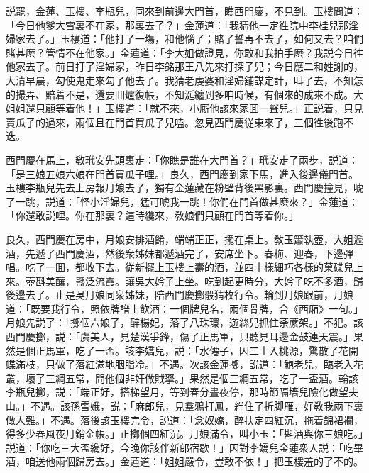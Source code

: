 説罷，金蓮、玉樓、李瓶兒，同來到前邊大門首，瞧西門慶，不見到。玉樓問道：「今日他爹大雪裏不在家，那裏去了？」金蓮道：「我猜他一定徃院中李桂兒那淫婦家去了。」玉樓道：「他打了一塲，和他惱了；賭了誓再不去了，如何又去？咱們賭甚麽？管情不在他家。」金蓮道：「李大姐做證見，你敢和我拍手麽？我説今日徃他家去了。前日打了淫婦家，昨日李銘那王八先來打探子兒；今日應二和姓謝的，大清早晨，勾使鬼走來勾了他去了。我猜老虔婆和淫婦舖謀定計，叫了去，不知怎的撮弄、賠着不是，還要囬爐復帳，不知涎纏到多咱時候，有個來的成來不成。大姐姐還只顧等着他！」玉樓道：「就不來，小廝他該來家囬一聲兒。」正説着，只見賣瓜子的過來，兩個且在門首買瓜子兒嗑。忽見西門慶従東來了，三個徃後跑不迭。

西門慶在馬上，敎玳安先頭裏走：「你瞧是誰在大門首？」玳安走了兩步，説道：「是三娘五娘六娘在門首買瓜子哩。」良久，西門慶到家下馬，進入後邊儀門首。玉樓李瓶兒先去上房報月娘去了，獨有金蓮藏在粉壁背後黑影裏。西門慶撞見，唬了一跳，説道：「怪小淫婦兒，猛可唬我一跳！你們在門首做甚麽來？」金蓮道：「你還敢説哩。你在那裏？這時纔來，敎娘們只顧在門首等着你。」

良久，西門慶在房中，月娘安排酒餚，端端正正，擺在桌上。敎玉簫執壺，大姐遞酒，先遞了西門慶酒，然後衆姊妹都遞酒完了，安席坐下。春梅、迎春，下邊彈唱。吃了一囬，都收下去。従新擺上玉樓上壽的酒，並四十樣細巧各樣的菓碟兒上來。壺斟美釀，盞泛流霞。讓吳大妗子上坐。吃到起更時分，大妗子吃不多酒，歸後邊去了。止是吳月娘同衆姊妹，陪西門慶擲骰猜枚行令。輪到月娘跟前，月娘道：「既要我行令，照依牌譜上飲酒：一個牌兒名，兩個骨牌，合《西廂》一句。」月娘先説了：「擲個六娘子，醉楊妃，落了八珠環，遊絲兒抓住荼䕷架。」不犯。該西門慶擲，説：「虞美人，見楚漢爭鋒，傷了正馬軍，只聽見耳邊金鼓連天震。」果然是個正馬軍，吃了一盃。該李嬌兒，説：「水僊子，因二士入桃源，驚散了花開蝶滿枝，只做了落紅滿地胭脂冷。」不遇。次該金蓮擲，説道：「鮑老兒，臨老入花叢，壞了三綱五常，問他個非奸做賊拏。」果然是個三綱五常，吃了一盃酒。輪該李瓶兒擲，説：「端正好，搭梯望月，等到春分晝夜停，那時節隔墻兒險化做望夫山。」不遇。該孫雪娥，説：「麻郎兒，見羣鴉打鳳，絆住了折脚雁，好敎我兩下裏做人難。」不遇。落後該玉樓完令，説道：「念奴嬌，醉扶定四紅沉，拖着錦裙襴，得多少春風夜月銷金帳。」正擲個四紅沉。月娘滿令，叫小玉：「斟酒與你三娘吃。」説道：「你吃三大盃纔好，今晚你該伴新郎宿歇！」因對李嬌兒金蓮衆人説：「吃畢酒，咱送他兩個歸房去。」金蓮道：「姐姐嚴令，豈敢不依！」把玉樓羞的了不的。

